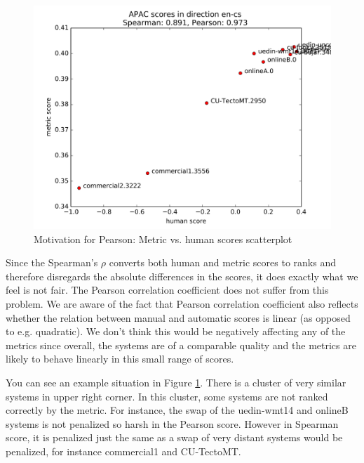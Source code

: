 \begin{figure}[H]
    \begin{center}
        \includegraphics[width=\textwidth]{img/pearson-motivation.pdf}
    \end{center}

    \caption[Motivation for Pearson: Metric vs. human scores scatterplot]{
      Motivation for Pearson: Metric vs. human scores scatterplot
}

    \label{motivation-pearson}
\end{figure}
\afterpage{\clearpage}

Since the Spearman's $\rho$ converts both human and metric scores to ranks and
therefore disregards the absolute differences in the scores, it does exactly what
we feel is not fair. The Pearson correlation coefficient does not suffer from this 
problem. We are aware of the fact that Pearson correlation coefficient also
reflects whether the relation between manual and automatic scores is linear (as
opposed to e.g. quadratic). We don't think this would be negatively affecting
any of the metrics since overall, the systems are of a comparable quality and
the metrics are likely to behave linearly in this small
range of scores.


You can see an example situation in Figure \ref{motivation-pearson}. There is a cluster
of very similar systems in upper right corner. In this cluster, some systems
are not ranked correctly by the metric. For instance, the swap of the uedin-wmt14
and onlineB systems is not penalized so harsh in the Pearson score. However
in Spearman score, it is penalized just the same as a swap of very distant
systems would be penalized, for instance commercial1 and CU-TectoMT.


